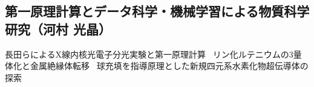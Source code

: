 \subsection{第一原理計算とデータ科学・機械学習による物質科学研究（河村 光晶）}

長田らによるX線内核光電子分光実験と第一原理計算~\cite{osada.pccp.24.21705}
リン化ルテニウムの3量体化と金属絶縁体転移~\cite{hirai.jacs.144.17857}
球充填を指導原理とした新規四元系水素化物超伝導体の探索~\cite{koshoji.prm.6.114802}